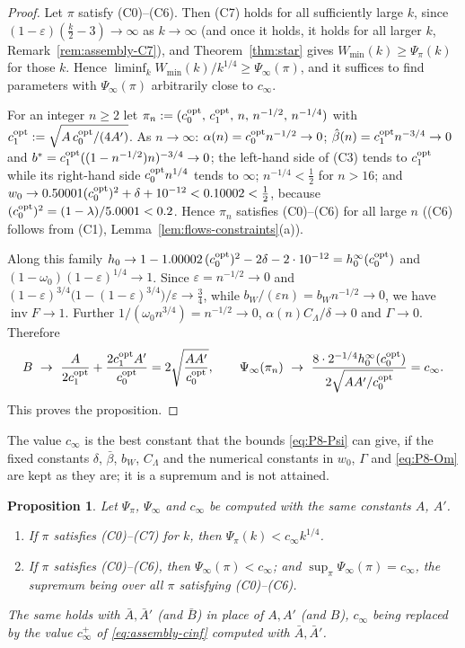 \documentclass[11pt]{amsart}
\newcommand{\eps}{\varepsilon}
\newcommand{\invF}{\operatorname{inv}F}
\newcommand{\bbar}{\bar\beta}
\newcommand{\Lam}{\Lambda}
\newtheorem{proposition}[theorem]{Proposition}
\theoremstyle{definition}
\theoremstyle{remark}
\numberwithin{equation}{section}
\begin{document}
\begin{proof}
Let $\pi$ satisfy (C0)--(C6). Then (C7) holds for all sufficiently large $k$, since $(1-\eps)(\frac k2-3)\to\infty$ as
$k\to\infty$ (and once it holds, it holds for all larger $k$, Remark~\ref{rem:assembly-C7}), and
Theorem~\ref{thm:star} gives $W_{\min}(k)\ge\Psi_\pi(k)$ for those $k$. Hence
$\liminf_kW_{\min}(k)/k^{1/4}\ge\Psi_\infty(\pi)$, and it suffices to find parameters with $\Psi_\infty(\pi)$
arbitrarily close to $c_\infty$.

For an integer $n\ge2$ let $\pi_n:=(c_0^{\rm opt},\,c_1^{\rm opt},\,n,\,n^{-1/2},\,n^{-1/4})$ with
$c_1^{\rm opt}:=\sqrt{A\,c_0^{\rm opt}/(4A')}$. As $n\to\infty$: $\alpha(n)=c_0^{\rm opt}n^{-1/2}\to0$;
$\hat\beta(n)=c_1^{\rm opt}n^{-3/4}\to0$ and $b^*=c_1^{\rm opt}((1-n^{-1/2})n)^{-3/4}\to0$; the left-hand side of (C3)
tends to $c_1^{\rm opt}$ while its right-hand side $c_0^{\rm opt}n^{1/4}$ tends to $\infty$; $n^{-1/4}<\frac12$ for
$n>16$; and $w_0\to0.50001(c_0^{\rm opt})^2+\delta+10^{-12}<0.10002<\frac12$, because
$(c_0^{\rm opt})^2=(1-\lambda)/5.0001<0.2$. Hence $\pi_n$ satisfies (C0)--(C6) for all large $n$ ((C6) follows from
(C1), Lemma~\ref{lem:flows-constraints}(a)).

Along this family $h_0\to1-1.00002\,(c_0^{\rm opt})^2-2\delta-2\cdot10^{-12}=h_0^\infty(c_0^{\rm opt})$ and
$(1-\omega_0)(1-\eps)^{1/4}\to1$. Since $\eps=n^{-1/2}\to0$ and
$(1-\eps)^{3/4}\big(1-(1-\eps)^{3/4}\big)/\eps\to\frac34$, while $b_W/(\eps n)=b_Wn^{-1/2}\to0$, we have $\invF\to1$.
Further $1/(\omega_0n^{3/4})=n^{-1/2}\to0$, $\alpha(n)C_\Lam/\delta\to0$ and $\Gamma\to0$. Therefore
\[
B\ \to\ \frac{A}{2c_1^{\rm opt}}+\frac{2c_1^{\rm opt}A'}{c_0^{\rm opt}}=2\sqrt{\frac{AA'}{c_0^{\rm opt}}},\qquad
\Psi_\infty(\pi_n)\ \to\ \frac{8\cdot2^{-1/4}h_0^\infty(c_0^{\rm opt})}{2\sqrt{AA'/c_0^{\rm opt}}}=c_\infty .
\]
This proves the proposition.
\end{proof}

The value $c_\infty$ is the best constant that the bounds \eqref{eq:P8-Psi} can give, if the fixed constants
$\delta$, $\bbar$, $b_W$, $C_\Lam$ and the numerical constants in $w_0$, $\Gamma$ and \eqref{eq:P8-Om} are kept as they
are; it is a supremum and is not attained.

\begin{proposition}\label{prop:assembly-sup}
Let $\Psi_\pi$, $\Psi_\infty$ and $c_\infty$ be computed with the same constants $A$, $A'$.
\begin{enumerate}[label=\textup{(\alph*)}]
\item If $\pi$ satisfies \textup{(C0)--(C7)} for $k$, then $\Psi_\pi(k)<c_\infty k^{1/4}$.
\item If $\pi$ satisfies \textup{(C0)--(C6)}, then $\Psi_\infty(\pi)<c_\infty$; and
  $\sup_\pi\Psi_\infty(\pi)=c_\infty$, the supremum being over all $\pi$ satisfying \textup{(C0)--(C6)}.
\end{enumerate}
The same holds with $\bar A,\bar A'$ (and $\bar B$) in place of $A,A'$ (and $B$), $c_\infty$ being replaced by the value
$c_\infty^+$ of \eqref{eq:assembly-cinf} computed with $\bar A,\bar A'$.
\end{proposition}
\end{document}
